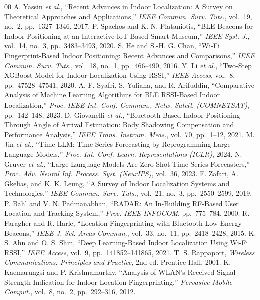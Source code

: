 \documentclass[conference]{IEEEtran}
\begin{document}
\begin{thebibliography}{00}
 A. Yassin \textit{et al.}, ``Recent Advances in Indoor Localization: A Survey on Theoretical Approaches and Applications,'' \textit{IEEE Commun. Surv. Tuts.}, vol.~19, no.~2, pp.~1327--1346, 2017.
 P. Spachos and K. N. Plataniotis, ``BLE Beacons for Indoor Positioning at an Interactive IoT-Based Smart Museum,'' \textit{IEEE Syst. J.}, vol.~14, no.~3, pp.~3483--3493, 2020.
 S. He and S.-H. G. Chan, ``Wi-Fi Fingerprint-Based Indoor Positioning: Recent Advances and Comparisons,'' \textit{IEEE Commun. Surv. Tuts.}, vol.~18, no.~1, pp.~466--490, 2016.
 Y. Li \textit{et al.}, ``Two-Step XGBoost Model for Indoor Localization Using RSSI,'' \textit{IEEE Access}, vol.~8, pp.~47528--47541, 2020.
 A. F. Syafri, S. Yuliana, and R. Arifuddin, ``Comparative Analysis of Machine Learning Algorithms for BLE RSSI-Based Indoor Localization,'' \textit{Proc. IEEE Int. Conf. Commun., Netw. Satell. (COMNETSAT)}, pp.~142--148, 2023.
 D. Giovanelli \textit{et al.}, ``Bluetooth-Based Indoor Positioning Through Angle of Arrival Estimation: Body Shadowing Compensation and Performance Analysis,'' \textit{IEEE Trans. Instrum. Meas.}, vol.~70, pp.~1--12, 2021.
 M. Jin \textit{et al.}, ``Time-LLM: Time Series Forecasting by Reprogramming Large Language Models,'' \textit{Proc. Int. Conf. Learn. Representations (ICLR)}, 2024.
 N. Gruver \textit{et al.}, ``Large Language Models Are Zero-Shot Time Series Forecasters,'' \textit{Proc. Adv. Neural Inf. Process. Syst. (NeurIPS)}, vol.~36, 2023.
 F. Zafari, A. Gkelias, and K. K. Leung, ``A Survey of Indoor Localization Systems and Technologies,'' \textit{IEEE Commun. Surv. Tuts.}, vol.~21, no.~3, pp.~2550--2599, 2019.
 P. Bahl and V. N. Padmanabhan, ``RADAR: An In-Building RF-Based User Location and Tracking System,'' \textit{Proc. IEEE INFOCOM}, pp.~775--784, 2000.
 R. Faragher and R. Harle, ``Location Fingerprinting with Bluetooth Low Energy Beacons,'' \textit{IEEE J. Sel. Areas Commun.}, vol.~33, no.~11, pp.~2418--2428, 2015.
 K. S. Ahn and O. S. Shin, ``Deep Learning-Based Indoor Localization Using Wi-Fi RSSI,'' \textit{IEEE Access}, vol.~9, pp.~141852--141865, 2021.
 T. S. Rappaport, \textit{Wireless Communications: Principles and Practice}, 2nd ed. Prentice Hall, 2001.
 K. Kaemarungsi and P. Krishnamurthy, ``Analysis of WLAN's Received Signal Strength Indication for Indoor Location Fingerprinting,'' \textit{Pervasive Mobile Comput.}, vol.~8, no.~2, pp.~292--316, 2012.

\end{thebibliography}
\end{document}
